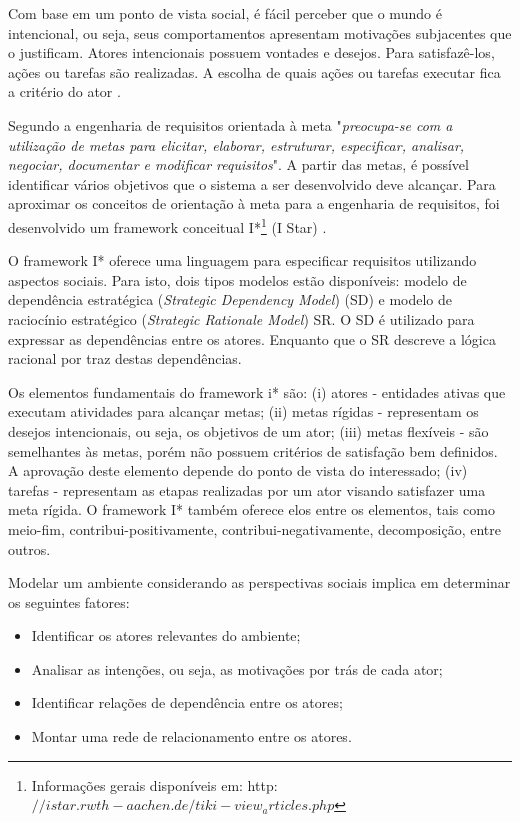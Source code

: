 Com base em um ponto de vista social, é fácil perceber que o mundo é intencional, ou seja, seus comportamentos apresentam motivações subjacentes que o justificam. Atores intencionais possuem vontades e desejos. Para satisfazê-los, ações ou tarefas são realizadas. A escolha de quais ações ou tarefas executar fica a critério do ator \cite{yu2011}.

Segundo  a engenharia de requisitos orientada à meta "\textit{preocupa-se com a utilização de metas para elicitar, elaborar, estruturar, especificar, analisar, negociar, documentar e modificar requisitos}". A partir das metas, é possível identificar vários objetivos que o sistema a ser desenvolvido deve alcançar. Para aproximar os conceitos de orientação à meta para a engenharia de requisitos, foi desenvolvido um framework conceitual I*\footnote{Informações gerais disponíveis em: http:$//istar.rwth-aachen.de/tiki-view_articles.php$} (I Star) \cite{yu1996}.

O framework I* oferece uma linguagem para especificar requisitos utilizando aspectos sociais. Para isto, dois tipos modelos estão disponíveis: modelo de dependência estratégica (\textit{Strategic Dependency Model}) (SD) e modelo de raciocínio estratégico (\textit{Strategic Rationale Model}) SR. O SD é utilizado para expressar as dependências entre os atores. Enquanto que o SR descreve a lógica racional por traz destas dependências.   

Os elementos fundamentais do framework i* são: (i) atores - entidades ativas que executam atividades para alcançar metas; (ii) metas rígidas - representam os desejos intencionais, ou seja, os objetivos de um ator; (iii) metas flexíveis - são semelhantes às metas, porém não possuem critérios de satisfação bem definidos. A aprovação deste elemento depende do ponto de vista do interessado; (iv) tarefas - representam as etapas realizadas por um ator visando satisfazer uma meta rígida. O framework I* também oferece elos entre os elementos, tais como meio-fim, contribui-positivamente, contribui-negativamente, decomposição, entre outros.  

Modelar um ambiente considerando as perspectivas sociais implica em determinar os seguintes fatores:
\begin{itemize}
\item Identificar os atores relevantes do ambiente;
\item Analisar as intenções, ou seja, as motivações por trás de cada ator;
\item Identificar relações de dependência entre os atores;
\item Montar uma rede de relacionamento entre os atores.
\end{itemize}

